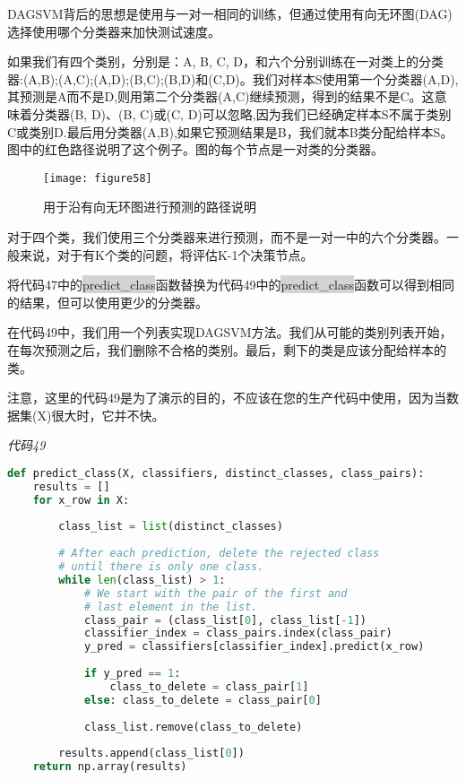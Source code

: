 DAGSVM背后的思想是使用与一对一相同的训练，但通过使用有向无环图(DAG)选择使用哪个分类器来加快测试速度。

如果我们有四个类别，分别是：A, B, C, D，和六个分别训练在一对类上的分类器:(A,B);(A,C);(A,D);(B,C);(B,D)和(C,D)。我们对样本S使用第一个分类器(A,D),其预测是A而不是D,则用第二个分类器(A,C)继续预测，得到的结果不是C。这意味着分类器(B, D)、(B, C)或(C, D)可以忽略,因为我们已经确定样本S不属于类别C或类别D.最后用分类器(A,B),如果它预测结果是B，我们就本B类分配给样本S。图中的红色路径说明了这个例子。图的每个节点是一对类的分类器。

\begin{figure}[ht]
	\centering
	\texttt{[image: figure58]}
	\caption{用于沿有向无环图进行预测的路径说明}
	\label{figure58}
\end{figure}

对于四个类，我们使用三个分类器来进行预测，而不是一对一中的六个分类器。一般来说，对于有K个类的问题，将评估K-1个决策节点。

将代码47中的\colorbox{lightgray}{predict\_class}函数替换为代码49中的\colorbox{lightgray}{predict\_class}函数可以得到相同的结果，但可以使用更少的分类器。

在代码49中，我们用一个列表实现DAGSVM方法。我们从可能的类别列表开始，在每次预测之后，我们删除不合格的类别。最后，剩下的类是应该分配给样本的类。

注意，这里的代码49是为了演示的目的，不应该在您的生产代码中使用，因为当数据集(X)很大时，它并不快。

\emph{代码49}

\begin{lstlisting}[language=python]
def predict_class(X, classifiers, distinct_classes, class_pairs): 
    results = [] 
    for x_row in X: 
        
        class_list = list(distinct_classes) 
        
        # After each prediction, delete the rejected class 
        # until there is only one class. 
        while len(class_list) > 1: 
            # We start with the pair of the first and 
            # last element in the list. 
            class_pair = (class_list[0], class_list[-1]) 
            classifier_index = class_pairs.index(class_pair) 
            y_pred = classifiers[classifier_index].predict(x_row) 
            
            if y_pred == 1: 
                class_to_delete = class_pair[1] 
            else: class_to_delete = class_pair[0] 
            
            class_list.remove(class_to_delete) 
        
        results.append(class_list[0]) 
    return np.array(results)

\end{lstlisting}

